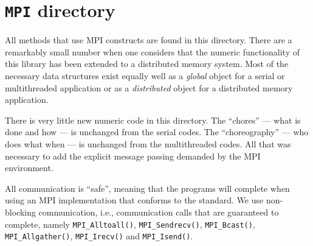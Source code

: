 \chapter{{\tt MPI} directory}
\label{chapter:MPI}
\par
All methods that use MPI constructs are found in this directory.
There are a remarkably small number when one
considers that the numeric functionality of this library has been
extended to a distributed memory system.
Most of the necessary data structures exist equally well as 
a {\it global} object for a serial or multithreaded application 
or as a {\it distributed} object for a distributed memory application.
\par
There is very little new numeric code in this directory.
The ``chores'' --- what is done and how --- is unchanged from the
serial codes.
The ``choreography'' --- who does what when --- is unchanged from the
multithreaded codes.
All that was necessary to add the explicit message passing demanded
by the MPI environment.
\par
All communication is ``safe'', meaning that the programs will complete 
when using an MPI implementation that conforms to the standard.
We use non-blocking communication, i.e., communication calls that
are guaranteed to complete, namely
{\tt MPI\_Alltoall()},
{\tt MPI\_Sendrecv()},
{\tt MPI\_Bcast()},
{\tt MPI\_Allgather()},
{\tt MPI\_Irecv()} and
{\tt MPI\_Isend()}.
